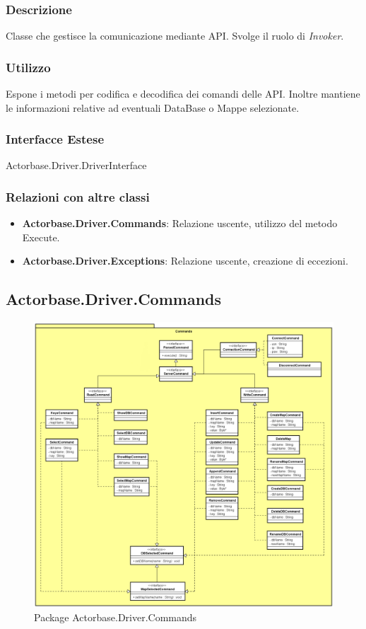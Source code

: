 \documentclass[a4paper]{article}
\begin{document}
		\subsubsection{Descrizione}
			Classe che gestisce la comunicazione mediante API. Svolge il ruolo di \emph{Invoker}.
		\subsubsection{Utilizzo}
			Espone i metodi per codifica e decodifica dei comandi delle API. Inoltre mantiene le informazioni relative ad eventuali DataBase o Mappe selezionate.
		\subsubsection{Interfacce Estese}
			Actorbase.Driver.DriverInterface
		\subsubsection{Relazioni con altre classi}
		\begin{itemize}
			\item \textbf{Actorbase.Driver.Commands}: Relazione uscente, utilizzo del metodo Execute.
			\item \textbf{Actorbase.Driver.Exceptions}: Relazione uscente, creazione di eccezioni.
		\end{itemize}
		
		
	\subsection{Actorbase.Driver.Commands}
		\begin{figure} [H]
			\centering
			\includegraphics[scale=0.40]{ST/Client/CommandsClasses.png}
			\caption{Package Actorbase.Driver.Commands}
		\end{figure}
\end{document}
